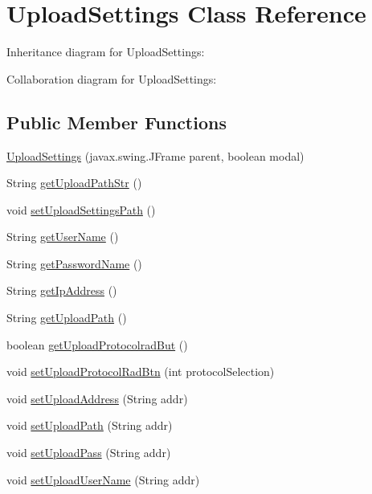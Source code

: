 \hypertarget{class_microchip_m_p_f_s_1_1_upload_settings}{}\section{Upload\+Settings Class Reference}
\label{class_microchip_m_p_f_s_1_1_upload_settings}


Inheritance diagram for Upload\+Settings\+:


Collaboration diagram for Upload\+Settings\+:
\subsection*{Public Member Functions}
\begin{DoxyCompactItemize}
\item 
\hyperlink{class_microchip_m_p_f_s_1_1_upload_settings_a555796fa2180fa124c3f9516b38dbadb}{Upload\+Settings} (javax.\+swing.\+J\+Frame parent, boolean modal)
\item 
String \hyperlink{class_microchip_m_p_f_s_1_1_upload_settings_ae291d5839bf2ed859bbb259289f1d0b5}{get\+Upload\+Path\+Str} ()
\item 
void \hyperlink{class_microchip_m_p_f_s_1_1_upload_settings_abc4fd67a103bc18cbdeabac02c9dac0c}{set\+Upload\+Settings\+Path} ()
\item 
String \hyperlink{class_microchip_m_p_f_s_1_1_upload_settings_ae3cc9307a896bbfcf570a0d077708f58}{get\+User\+Name} ()
\item 
String \hyperlink{class_microchip_m_p_f_s_1_1_upload_settings_a118808e15636dccb5d58916fcf098941}{get\+Password\+Name} ()
\item 
String \hyperlink{class_microchip_m_p_f_s_1_1_upload_settings_a1384b66756e9f5666860d278c518548a}{get\+Ip\+Address} ()
\item 
String \hyperlink{class_microchip_m_p_f_s_1_1_upload_settings_a7326c42720b7415994c23eb68cd5147e}{get\+Upload\+Path} ()
\item 
boolean \hyperlink{class_microchip_m_p_f_s_1_1_upload_settings_a9c5d9c16fc4e783721d12bb5487b8088}{get\+Upload\+Protocolrad\+But} ()
\item 
void \hyperlink{class_microchip_m_p_f_s_1_1_upload_settings_aa66a7201ad91c9c9d46f68704342cbb8}{set\+Upload\+Protocol\+Rad\+Btn} (int protocol\+Selection)
\item 
void \hyperlink{class_microchip_m_p_f_s_1_1_upload_settings_a6364d6e99d6ae77da46d43bce8789065}{set\+Upload\+Address} (String addr)
\item 
void \hyperlink{class_microchip_m_p_f_s_1_1_upload_settings_ab7063c8a0099ddcc67856ca791461c2c}{set\+Upload\+Path} (String addr)
\item 
void \hyperlink{class_microchip_m_p_f_s_1_1_upload_settings_ae91a9b256cbc0844ebc6f9f7f192bd90}{set\+Upload\+Pass} (String addr)
\item 
void \hyperlink{class_microchip_m_p_f_s_1_1_upload_settings_ac980f345aa54d2f1a8f543051831189d}{set\+Upload\+User\+Name} (String addr)
\end{DoxyCompactItemize}
